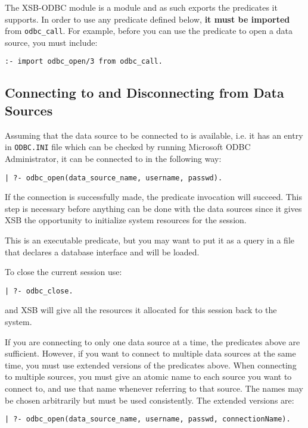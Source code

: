 The XSB-ODBC module is a module and as such exports the predicates it
supports.  In order to use any predicate defined below, {\bf it must be
imported} from {\tt odbc\_call}.  For example, before you can use the
predicate to open a data source, you must include:

\begin{verbatim}
:- import odbc_open/3 from odbc_call.
\end{verbatim}

\subsection{Connecting to and Disconnecting from Data Sources}

Assuming that the data source to be connected to is available, i.e. it has an 
entry in {\tt ODBC.INI} file which can be checked by running Microsoft 
ODBC Administrator, it can be connected to in the following way: 

\begin{verbatim}
| ?- odbc_open(data_source_name, username, passwd).
\end{verbatim}

If the connection is successfully made, the predicate invocation will
succeed.  This step is necessary before anything can be done with the
data sources since it gives XSB the opportunity to initialize system
resources for the session.

This is an executable predicate, but you may want to put it as a query
in a file that declares a database interface and will be loaded.

To close the current session use:
\begin{verbatim}
| ?- odbc_close.
\end{verbatim}

and XSB will give all the resources it allocated for this session back
to the system.

If you are connecting to only one data source at a time, the
predicates above are sufficient.  However, if you want to connect to
multiple data sources at the same time, you must use extended versions
of the predicates above.  When connecting to multiple sources, you
must give an atomic name to each source you want to connect to, and
use that name whenever referring to that source.  The names may be
chosen arbitrarily but must be used consistently.  The extended
versions are:

\begin{verbatim}
| ?- odbc_open(data_source_name, username, passwd, connectionName).
\end{verbatim}

